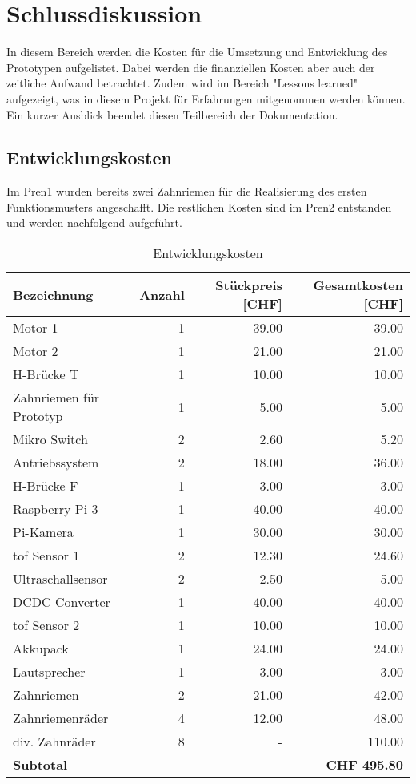 \newpage
\section{Schlussdiskussion}

In diesem Bereich werden die Kosten für die Umsetzung und Entwicklung des Prototypen aufgelistet. Dabei werden die finanziellen Kosten aber auch der zeitliche Aufwand betrachtet. Zudem wird im Bereich "Lessons learned" aufgezeigt, was in diesem Projekt für Erfahrungen mitgenommen werden können. Ein kurzer Ausblick beendet diesen Teilbereich der Dokumentation.

\subsection{Entwicklungskosten}

Im Pren1 wurden bereits zwei Zahnriemen für die Realisierung des ersten Funktionsmusters angeschafft. Die restlichen Kosten sind im Pren2 entstanden und werden nachfolgend aufgeführt.

\begin{center}
\centering
\begin{table}[H]
\begin{tabular}{|l|r|r|r|}
\hline 
\textbf{Bezeichnung} & \textbf{Anzahl} &
\textbf{Stückpreis [CHF]} & \textbf{Gesamtkosten [CHF]} \\
\hline 
Motor 1 & 1 & 39.00 & 39.00 \\
\hline
Motor 2 & 1 & 21.00 & 21.00 \\
\hline
H-Brücke T & 1 & 10.00 & 10.00\\
\hline
Zahnriemen für Prototyp & 1 & 5.00 & 5.00 \\
\hline
Mikro Switch & 2 & 2.60  & 5.20\\
\hline
Antriebssystem & 2 & 18.00  & 36.00\\
\hline
H-Brücke F & 1 & 3.00 & 3.00 \\
\hline
Raspberry Pi 3 & 1 & 40.00 & 40.00 \\
\hline
Pi-Kamera & 1 & 30.00 & 30.00 \\
\hline
\acrshort{tof} Sensor 1 & 2 & 12.30 & 24.60 \\
\hline
Ultraschallsensor & 2 & 2.50 & 5.00 \\
\hline
DCDC Converter & 1 & 40.00 & 40.00 \\
\hline
\acrshort{tof} Sensor 2 & 1 & 10.00 & 10.00 \\
\hline
Akkupack & 1 & 24.00  & 24.00 \\
\hline
Lautsprecher & 1 & 3.00 & 3.00\\
\hline 
Zahnriemen & 2 & 21.00 & 42.00\\
\hline
Zahnriemenräder & 4 & 12.00 & 48.00\\
\hline
div. Zahnräder & 8 & - & 110.00\\
\hline \hline 
 \textbf{Subtotal} &&& \textbf{CHF 495.80}\\
\hline 
\end{tabular}
\caption[Entwicklungskosten]{Entwicklungskosten}
\label{tab:kosten}
\end{table}
\end{center}

